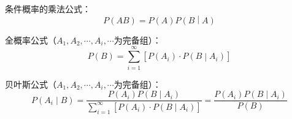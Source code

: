 条件概率的乘法公式：
\[
P\left( AB \right) =P\left( A \right) P\left( B \middle| A \right)
\]

全概率公式（$A_1,A_2,\cdots ,A_i,\cdots $为完备组）：
\[
P\left( B \right) =\sum_{i=1}^{\infty}{\left[ P\left( A_i \right) \cdot P\left( B \middle| A_i \right) \right]}
\]

贝叶斯公式（$A_1,A_2,\cdots ,A_i,\cdots $为完备组）：
\[
P\left( A_i \middle| B \right) =\frac{P\left( A_i \right) P\left( B \middle| A_i \right)}{\sum_{i=1}^{\infty}{\left[ P\left( A_i \right) \cdot P\left( B \middle| A_i \right) \right]}}=\frac{P\left( A_i \right) P\left( B \middle| A_i \right)}{P\left( B \right)}
\]




